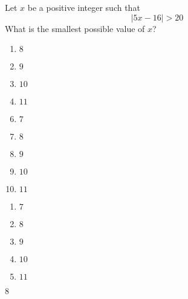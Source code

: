

  Let $x$ be a positive integer such that \[|5x-16|>20\] What is the smallest possible value of $x$? 
 


\ifsat
	\begin{enumerate}[label=\Alph*)]
		\item  $8$%
		\item  $9$
		\item  $10$
		\item  $11$
	\end{enumerate}
\else
\fi

\ifacteven
	\begin{enumerate}[label=\textbf{\Alph*.},itemsep=\fill,align=left]
		\setcounter{enumii}{5}
		\item   $7$ 
		\item  $8$%
		\item  $9$
		\addtocounter{enumii}{1}
		\item  $10$
		\item  $11$
	\end{enumerate}
\else
\fi

\ifactodd
	\begin{enumerate}[label=\textbf{\Alph*.},itemsep=\fill,align=left]
		\item   $7$ 
		\item  $8$%
		\item  $9$
		\item  $10$
		\item  $11$
	\end{enumerate}
\else
\fi

\ifgridin
  $8$%
		
\else
\fi

